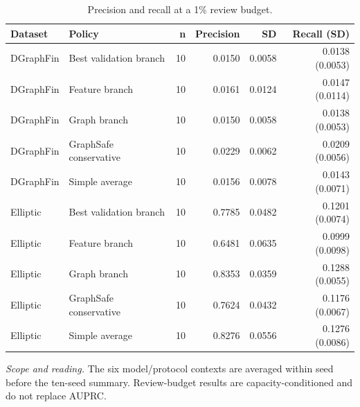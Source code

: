 \begin{table}[tbp]
\centering
\footnotesize
\setlength{\tabcolsep}{3.2pt}
\renewcommand{\arraystretch}{1.12}
\caption{Precision and recall at a 1\% review budget.}
\label{tab:s-review-budget-1pct}
\begin{tabularx}{\textwidth}{@{}>{\raggedright\arraybackslash}p{} Y r r r r@{}}
\toprule
\textbf{Dataset} & \textbf{Policy} & \textbf{n} & \textbf{Precision} & \textbf{SD} & \textbf{Recall (SD)} \\
\midrule
DGraphFin & Best validation branch & 10 & 0.0150 & 0.0058 & 0.0138 (0.0053) \\
DGraphFin & Feature branch & 10 & 0.0161 & 0.0124 & 0.0147 (0.0114) \\
DGraphFin & Graph branch & 10 & 0.0150 & 0.0058 & 0.0138 (0.0053) \\
DGraphFin & GraphSafe conservative & 10 & 0.0229 & 0.0062 & 0.0209 (0.0056) \\
DGraphFin & Simple average & 10 & 0.0156 & 0.0078 & 0.0143 (0.0071) \\
Elliptic & Best validation branch & 10 & 0.7785 & 0.0482 & 0.1201 (0.0074) \\
Elliptic & Feature branch & 10 & 0.6481 & 0.0635 & 0.0999 (0.0098) \\
Elliptic & Graph branch & 10 & 0.8353 & 0.0359 & 0.1288 (0.0055) \\
Elliptic & GraphSafe conservative & 10 & 0.7624 & 0.0432 & 0.1176 (0.0067) \\
Elliptic & Simple average & 10 & 0.8276 & 0.0556 & 0.1276 (0.0086) \\
\bottomrule
\end{tabularx}
\vspace{2pt}
\begin{minipage}{\textwidth}\footnotesize\emph{Scope and reading.} The six model/protocol contexts are averaged within seed before the ten-seed summary. Review-budget results are capacity-conditioned and do not replace AUPRC.\end{minipage}
\end{table}
